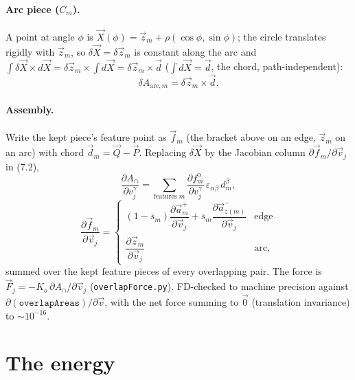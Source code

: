 \documentclass[11pt]{article}
\numberwithin{equation}{section}
\newcommand{\vv}[1]{\vec{#1}}
\begin{document}
\paragraph{Arc piece ($C_m$).} A point at angle $\phi$ is $\vv X(\phi)=\vv z_m+\rho(\cos\phi,\sin\phi)$;
the circle translates rigidly with $\vv z_m$, so $\delta\vv X=\delta\vv z_m$ is constant along the arc
and $\int\delta\vv X\times d\vv X=\delta\vv z_m\times\!\int d\vv X=\delta\vv z_m\times\vv d$ ($\int
d\vv X=\vv d$, the chord, path-independent):
\begin{equation}
  \delta A_{\text{arc},m}=\delta\vv z_m\times\vv d.
\end{equation}

\paragraph{Assembly.} Write the kept piece's feature point as $\vv f_m$ (the bracket above on an
edge, $\vv z_m$ on an arc) with chord $\vv d_m=\vv Q-\vv P$. Replacing $\delta\vv X$ by the Jacobian
column $\partial\vv f_m/\partial\vv v_j$ in (7.2),
\begin{equation}
  \frac{\partial A_{\cap}}{\partial v_j^{\gamma}}=\sum_{\text{features }m}\frac{\partial f_m^{\alpha}}{\partial v_j^{\gamma}}\,\varepsilon_{\alpha\beta}\,d_m^{\beta},
\end{equation}
\begin{equation}
  \frac{\partial\vv f_m}{\partial\vv v_j}=\begin{cases}(1-\bar s_m)\dfrac{\partial\vv a^{+}_m}{\partial\vv v_j}+\bar s_m\dfrac{\partial\vv a^{-}_{z(m)}}{\partial\vv v_j}&\text{edge}\\[8pt]\dfrac{\partial\vv z_m}{\partial\vv v_j}&\text{arc,}\end{cases}
\end{equation}
summed over the kept feature pieces of every overlapping pair.
The force is $\vv F_j=-K_o\,\partial A_{\cap}/\partial\vv v_j$ (\texttt{overlapForce.py}). FD-checked
to machine precision against $\partial(\texttt{overlapAreas})/\partial\vv v$, with the net force
summing to $\vv0$ (translation invariance) to $\sim10^{-16}$.

\section{The energy}
\end{document}
